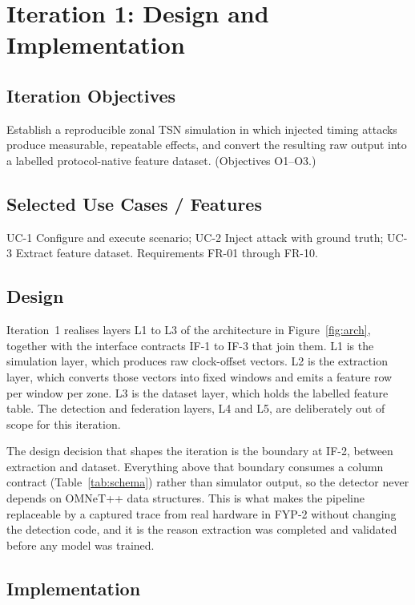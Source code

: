 \chapter{Iteration 1: Design and Implementation}
\label{ch:iteration1}

\section{Iteration Objectives}
Establish a reproducible zonal TSN simulation in which injected timing attacks
produce measurable, repeatable effects, and convert the resulting raw output into a
labelled protocol-native feature dataset. (Objectives O1--O3.)

\section{Selected Use Cases / Features}
UC-1 Configure and execute scenario; UC-2 Inject attack with ground truth;
UC-3 Extract feature dataset. Requirements FR-01 through FR-10.

\section{Design}
Iteration~1 realises layers L1 to L3 of the architecture in Figure~\ref{fig:arch},
together with the interface contracts IF-1 to IF-3 that join them. L1 is the
simulation layer, which produces raw clock-offset vectors. L2 is the extraction
layer, which converts those vectors into fixed windows and emits a feature row per
window per zone. L3 is the dataset layer, which holds the labelled feature table.
The detection and federation layers, L4 and L5, are deliberately out of scope for
this iteration.

The design decision that shapes the iteration is the boundary at IF-2, between
extraction and dataset. Everything above that boundary consumes a column contract
(Table~\ref{tab:schema}) rather than simulator output, so the detector never depends
on OMNeT++ data structures. This is what makes the pipeline replaceable by a captured
trace from real hardware in FYP-2 without changing the detection code, and it is the
reason extraction was completed and validated before any model was trained.

\section{Implementation}

